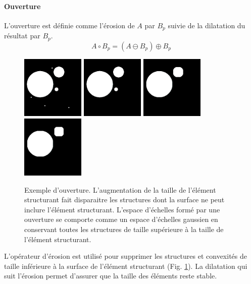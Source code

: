 \paragraph{Ouverture}
L'ouverture est définie comme l'érosion de $A$ par $B_p$ suivie de la dilatation du résultat par $B_p$.
\begin{equation}
 A \circ B_p = (A \ominus B_p) \oplus B_p
\end{equation}
\begin{figure}[h]
  \centering
  \includegraphics[height=3cm]{Images/morpho_init.png}
  \includegraphics[height=3cm]{Images/morpho_open_k5.png}
  \includegraphics[height=3cm]{Images/morpho_open_k21.png}
  \includegraphics[height=3cm]{Images/morpho_open_k31.png}
  \caption{Exemple d'ouverture. L'augmentation de la taille de l'élément structurant fait disparaitre les structures dont la surface ne peut inclure l'élément structurant. L'espace d'échelles formé par une ouverture se comporte comme un espace d'échelles gaussien en conservant toutes les structures de taille supérieure à la taille de l'élément structurant. }
  \label{fig:morpho_ouverture}
\end{figure}
L'opérateur d'érosion est utilisé pour supprimer les structures et convexités de taille inférieure à la surface de l'élément structurant (Fig. \ref{fig:morpho_ouverture}). La dilatation qui suit l'érosion permet d'assurer que la taille des éléments reste stable.

